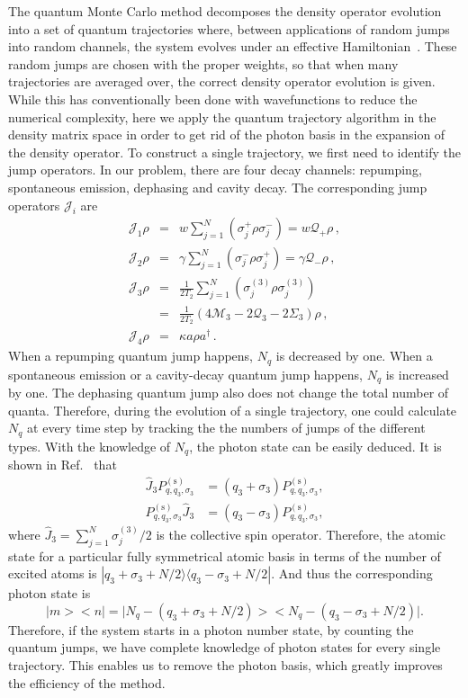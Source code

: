\documentclass[aps,
twocolumn,
superscriptaddress,groupedaddress]{revtex4}
\begin{document}
The quantum Monte Carlo method decomposes the density operator evolution
into a set of quantum trajectories where, between applications of random
jumps into random channels, the system evolves under an effective
Hamiltonian~\cite{Dalibard92,Dum92,Knight98}. These random jumps are chosen with the proper weights, so that when many trajectories are averaged over, the correct density operator evolution is given. While this has
conventionally been done with wavefunctions to reduce the numerical
complexity, here we apply the quantum trajectory algorithm in the
density matrix space in order to get rid of the photon basis in the
expansion of the density operator. To construct a single trajectory, we
first need to identify the jump operators. In our problem, there are
four decay channels: repumping, spontaneous emission, dephasing and
cavity decay. The corresponding jump operators $\mathcal{J}_i$ are
\begin{eqnarray}
\mathcal{J}_1\rho&=&
w\sum_{j=1}^N(\sigma_j^+\rho\sigma_j^-)=w\mathcal{Q}_{+}\rho\,,
\nonumber\\
\mathcal{J}_2\rho&=&
\gamma\sum_{j=1}^N(\sigma_j^-\rho\sigma_j^+)=
\gamma \mathcal{Q}_{-}\rho\,,\nonumber\\
\mathcal{J}_3\rho&=&
\frac{1}{2T_2}\sum_{j=1}^N(\sigma_j^{(3)}\rho\sigma_j^{(3)})
\nonumber\\
&=&\frac{1}{2T_2}(4\mathcal{M}_3-2  \mathcal{Q}_3-2\Sigma_3)\rho\,,
\nonumber\\
\mathcal{J}_4\rho&=&\kappa a\rho a^{\dagger}\,.
\label{jumpo}
\end{eqnarray}
When a repumping quantum jump happens, $N_q$ is decreased by one. When a
spontaneous emission or a cavity-decay quantum jump happens, $N_q$ is
increased by one. The dephasing quantum jump also does not change the
total number of quanta. Therefore, during the evolution of a single
trajectory, one could calculate $N_q$ at every time step by tracking the
the numbers of jumps of the different types. With the knowledge of
$N_q$, the photon state can be easily deduced. It is shown in
Ref.~\cite{PhysRevA.87.062101} that
\begin{equation}
\begin{split}
  \hat{J}_3P_{q,q_3,\sigma_3}^{(\mathrm{s})}&=
  (q_3+\sigma_3)P_{q,q_3,\sigma_3}^{(\mathrm{s})},\\
  P_{q,q_3,\sigma_3}^{(\mathrm{s})}\hat{J}_3&=
  (q_3-\sigma_3)P_{q,q_3,\sigma_3}^{(\mathrm{s})},
\end{split}
\end{equation}
where $\hat{J}_3=\sum_{j=1}^N\sigma_j^{(3)}/2$ is the collective spin
operator. Therefore, the atomic state for a particular fully symmetrical
atomic basis in terms of the number of excited atoms is
$|q_3+\sigma_3+N/2\rangle\langle q_3-\sigma_3+N/2|$. And thus the
corresponding photon state is
\begin{equation}
\bigl|m\bigr>\bigl<n\bigr|=
\bigl|N_q-(q_3+\sigma_3+N/2)\bigr>
\bigl<N_q-(q_3-\sigma_3+N/2)\bigr|.
\end{equation}
Therefore, if the system starts in a photon number state, by counting the quantum jumps, we have complete knowledge of
photon states for every single trajectory. This enables us to remove the
photon basis, which greatly improves the efficiency of the method. 
\end{document}
